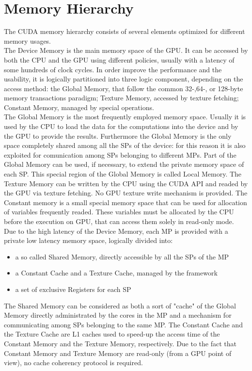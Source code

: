 \section{Memory Hierarchy}
The CUDA memory hierarchy consists of several elements optimized for different memory usages.\\
The Device Memory is the main memory space of the GPU. It can be accessed by both the CPU and the GPU using different policies, usually with a latency of some hundreds of clock cycles. In order improve the performance and the usability, it is logically partitioned into three logic component, depending on the access method: the Global Memory, that follow the common 32-,64-, or 128-byte memory transactions paradigm; Texture Memory, accessed by texture fetching; Constant Memory, managed by special operations.\\
The Global Memory is the most frequently employed memory space. Usually it is used by the CPU to load the data for the computations into the device and by the GPU to provide the results. Furthermore the Global Memory is the only space completely shared among all the SPs of the device: for this reason it is also exploited for comunication among SPs belonging to different MPs. Part of the Global Memory can be used, if necessary, to extend the private memory space of each SP. This special region of the Global Memory is called Local Memory. The Texture Memory can be written by the CPU using the CUDA API and readed by the GPU via texture fetching. No GPU texture write mechanism is provided. The Constant memory is a small special memory space that can be used for allocation of variables frequently readed. These variables must be allocated by the CPU before the execution on GPU, that can access them solely in read-only mode.\\ 
Due to the high latency of the Device Memory, each MP is provided with a private low latency memory space, logically divided into:
\begin{itemize}
\item a so called Shared Memory, directly accessible by all the SPs of the MP
\item a Constant Cache and a Texture Cache, managed by the framework
\item a set of exclusive Registers for each SP
\end{itemize}
The Shared Memory can be considered as both a sort of "cache" of the Global Memory 
 directly administrated by the cores in the MP and a mechanism for communicating among SPs belonging to the same MP. The Constant Cache and the Texture Cache are L1 caches used to speed-up the access time of the Constant Memory and the Texture Memory, respectively. Due to the fact that Constant Memory and Texture Memory are read-only (from a GPU point of view), no cache coherency protocol is required.\\ 


